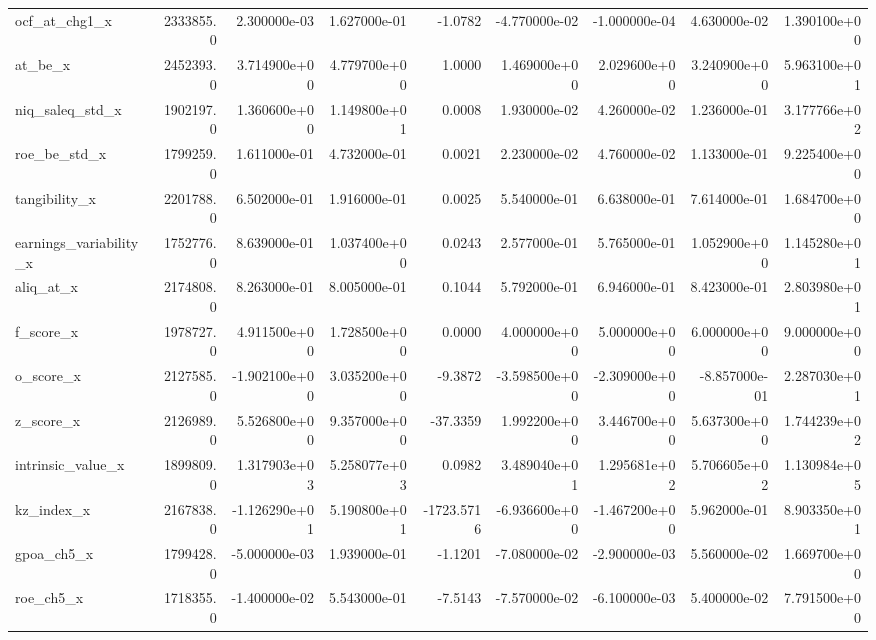 \documentclass[10pt]{article}
\begin{document}
\begin{landscape}
\begin{longtable}{|l|r|r|r|r|r|r|r|r|}
ocf\_at\_chg1\_x           &  2333855.0 &  2.300000e-03 &  1.627000e-01 &     -1.0782 & -4.770000e-02 & -1.000000e-04 &  4.630000e-02 &  1.390100e+00 \\
at\_be\_x                 &  2452393.0 &  3.714900e+00 &  4.779700e+00 &      1.0000 &  1.469000e+00 &  2.029600e+00 &  3.240900e+00 &  5.963100e+01 \\
niq\_saleq\_std\_x         &  1902197.0 &  1.360600e+00 &  1.149800e+01 &      0.0008 &  1.930000e-02 &  4.260000e-02 &  1.236000e-01 &  3.177766e+02 \\
roe\_be\_std\_x            &  1799259.0 &  1.611000e-01 &  4.732000e-01 &      0.0021 &  2.230000e-02 &  4.760000e-02 &  1.133000e-01 &  9.225400e+00 \\
tangibility\_x           &  2201788.0 &  6.502000e-01 &  1.916000e-01 &      0.0025 &  5.540000e-01 &  6.638000e-01 &  7.614000e-01 &  1.684700e+00 \\
earnings\_variability\_x  &  1752776.0 &  8.639000e-01 &  1.037400e+00 &      0.0243 &  2.577000e-01 &  5.765000e-01 &  1.052900e+00 &  1.145280e+01 \\
aliq\_at\_x               &  2174808.0 &  8.263000e-01 &  8.005000e-01 &      0.1044 &  5.792000e-01 &  6.946000e-01 &  8.423000e-01 &  2.803980e+01 \\
f\_score\_x               &  1978727.0 &  4.911500e+00 &  1.728500e+00 &      0.0000 &  4.000000e+00 &  5.000000e+00 &  6.000000e+00 &  9.000000e+00 \\
o\_score\_x               &  2127585.0 & -1.902100e+00 &  3.035200e+00 &     -9.3872 & -3.598500e+00 & -2.309000e+00 & -8.857000e-01 &  2.287030e+01 \\
z\_score\_x               &  2126989.0 &  5.526800e+00 &  9.357000e+00 &    -37.3359 &  1.992200e+00 &  3.446700e+00 &  5.637300e+00 &  1.744239e+02 \\
intrinsic\_value\_x       &  1899809.0 &  1.317903e+03 &  5.258077e+03 &      0.0982 &  3.489040e+01 &  1.295681e+02 &  5.706605e+02 &  1.130984e+05 \\
kz\_index\_x              &  2167838.0 & -1.126290e+01 &  5.190800e+01 &  -1723.5716 & -6.936600e+00 & -1.467200e+00 &  5.962000e-01 &  8.903350e+01 \\
gpoa\_ch5\_x              &  1799428.0 & -5.000000e-03 &  1.939000e-01 &     -1.1201 & -7.080000e-02 & -2.900000e-03 &  5.560000e-02 &  1.669700e+00 \\
roe\_ch5\_x               &  1718355.0 & -1.400000e-02 &  5.543000e-01 &     -7.5143 & -7.570000e-02 & -6.100000e-03 &  5.400000e-02 &  7.791500e+00 \\

\end{longtable}
\end{landscape}
\end{document}
